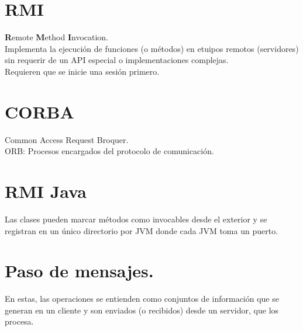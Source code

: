 \chapter{RMI}
\textbf{R}emote \textbf{M}ethod \textbf{I}nvocation.\\
Implementa la ejecuci\'{o}n de funciones (o m\'{e}todos) en etuipos remotos (servidores) sin requerir de un API especial o implementaciones complejas.\\
Requieren que se inicie una sesi\'{o}n primero.

\chapter{CORBA}
Common Access Request Broquer.\\
ORB: Procesos encargados del protocolo de comunicaci\'{o}n.

\chapter{RMI Java}
Las clases pueden marcar m\'{e}todos como invocables desde el exterior y se registran en un \'{u}nico directorio por JVM donde cada JVM toma un puerto.

\chapter{Paso de mensajes.}
En estas, las operaciones se entienden como conjuntos de informaci\'{o}n que se generan en un cliente y son enviados (o recibidos) desde un servidor, que los procesa.


